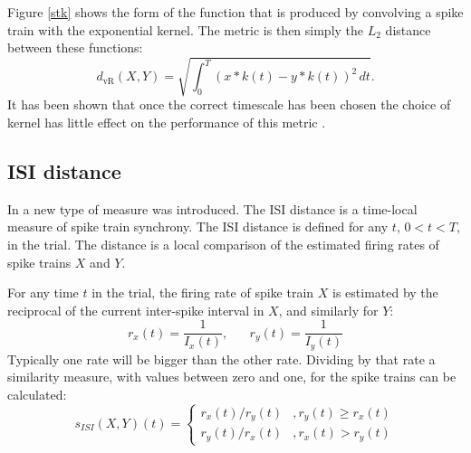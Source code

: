 
Figure \ref{stk} shows the form of the function that is produced by
convolving a spike train with the exponential kernel.  The metric is then simply the $L_2$ distance between these functions:
\begin{equation}
d_{\text{vR}}(X,Y) =  \sqrt{\int_0^T (x*k(t) - y*k(t))^2\,dt}.
\end{equation}
It has been shown that once the correct timescale has been chosen the choice of kernel has 
little effect on the performance of this metric \citep{HoughtonVictor2009a}.

\subsection{ISI distance}
In \citep{KreuzEtAl2007a} a new type of measure was introduced.  The ISI distance is a time-local measure of spike train synchrony.  The ISI distance is defined for any $t$, $0<t<T$, in the trial.  The distance is a local comparison of the estimated firing rates of spike trains $X$ and $Y$.  

For any time $t$ in the trial, the firing rate of spike train $X$ is estimated by the reciprocal of the current inter-spike interval in $X$, and similarly for $Y$:
\begin{equation}
r_x(t) = \frac{1}{I_x(t)}, \hspace{20pt} r_y(t) = \frac{1}{I_y(t)}
\end{equation}
Typically one rate will be bigger than the other rate. Dividing by that rate a similarity measure, with values between zero and one, for the spike trains can be calculated:
\begin{equation}
s_{ISI}(X,Y)(t) = \left\{ \begin{array}{ll} r_x(t)/r_y(t) & ,r_y(t) \geq r_x(t)\\ r_y(t)/r_x(t) & , r_x(t) > r_y(t) \end{array}\right.
\end{equation}

